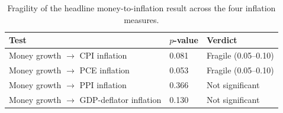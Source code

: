 \begin{table}[htbp]
\centering
\setlength{\belowcaptionskip}{8pt}
\small

\caption{Fragility of the headline money-to-inflation result across the four inflation measures.}
\label{tab:fragility}
\begin{tabular}{lll}
\toprule
Test & $p$-value & Verdict \\
\midrule
Money growth $\to$ CPI inflation & 0.081 & Fragile (0.05--0.10) \\
Money growth $\to$ PCE inflation & 0.053 & Fragile (0.05--0.10) \\
Money growth $\to$ PPI inflation & 0.366 & Not significant \\
Money growth $\to$ GDP-deflator inflation & 0.130 & Not significant \\
\bottomrule
\end{tabular}
\end{table}
